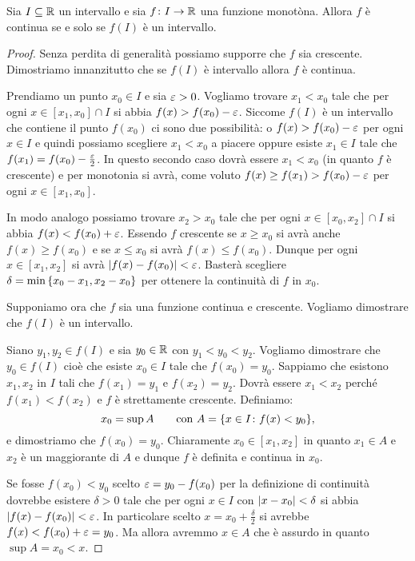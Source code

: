 \begin{theorem}
  \label{th:monotona_continua}%
  \mymark{*}%
  Sia $I\subseteq \mathbb R$ un intervallo e sia
  $f\colon I \to \mathbb R$ una funzione monotòna.
  Allora $f$ è continua se e solo se $f(I)$ è 
  un intervallo.
\end{theorem}
%
\begin{proof}
Senza perdita di generalità possiamo supporre che $f$ 
sia crescente. 
Dimostriamo innanzitutto che se $f(I)$ è intervallo allora $f$ è continua.

Prendiamo un punto $x_0\in I$ e sia $\varepsilon>0$.
Vogliamo trovare $x_1<x_0$ tale che  
per ogni $x\in [x_1,x_0]\cap I$ si abbia $f(x)>f(x_0)-\varepsilon$.
Siccome $f(I)$ è un intervallo che contiene il punto $f(x_0)$ 
ci sono due possibilità: o $f(x)>f(x_0)-\varepsilon$ per ogni $x\in I$
e quindi possiamo scegliere $x_1<x_0$ a piacere
oppure esiste $x_1\in I$ tale che $f(x_1)=f(x_0) - \frac {\varepsilon} 2$.
In questo secondo caso dovrà essere $x_1<x_0$ (in quanto $f$ è crescente)
e per monotonia si avrà, come voluto $f(x)\ge f(x_1) > f(x_0)-\varepsilon$ 
per ogni $x\in [x_1,x_0]$.

In modo analogo possiamo trovare $x_2>x_0$ tale 
che per ogni $x\in [x_0,x_2]\cap I$ si abbia $f(x) < f(x_0)+\varepsilon$.
Essendo $f$ crescente se $x\ge x_0$ si avrà anche $f(x)\ge f(x_0)$ 
e se $x\le x_0$ si avrà $f(x) \le f(x_0)$. 
Dunque per ogni $x\in [x_1,x_2]$ si avrà ${\left|f(x)-f(x_0)\right|}<\varepsilon$.
Basterà scegliere $\delta = \min{\left\{ x_0-x_1,x_2-x_0 \right\}}$ 
per ottenere la continuità di $f$ in $x_0$.

Supponiamo ora che $f$ sia una funzione continua e crescente.
Vogliamo dimostrare che $f(I)$ è un intervallo.

Siano $y_1, y_2 \in f(I)$ e sia $y_0\in \mathbb R$
con $y_1 < y_0 < y_2$.
Vogliamo dimostrare che $y_0\in f(I)$ cioè che esiste $x_0\in I$
tale che $f(x_0)=y_0$.
Sappiamo che esistono $x_1,x_2$ in $I$ tali che
$f(x_1) = y_1$ e $f(x_2) = y_2$.
Dovrà essere $x_1<x_2$ perché $f(x_1)<f(x_2)$ e
$f$ è strettamente crescente.
Definiamo:
\[
 x_0 = \sup A
\qquad
\text{con } A={\left\{ x\in I\colon f(x)<y_0 \right\}},
\]
e dimostriamo che $f(x_0)=y_0$. 
Chiaramente $x_0\in [x_1,x_2]$ in quanto 
$x_1\in A$ e $x_2$ è un maggiorante di $A$
e dunque $f$ è definita e continua in $x_0$.

Se fosse $f(x_0)<y_0$ scelto $\varepsilon = y_0-f(x_0)$
per la definizione di continuità dovrebbe esistere
$\delta>0$ tale che per ogni $x\in I$ con ${\left|x-x_0\right|}<\delta$
si abbia ${\left|f(x)-f(x_0)\right|}<\varepsilon$.
In particolare scelto $x=x_0+\frac \delta 2$
si avrebbe $f(x) < f(x_0) + \varepsilon = y_0$.
Ma allora avremmo $x\in A$ che è assurdo in quanto
$\sup A = x_0 < x$.


\end{proof}
